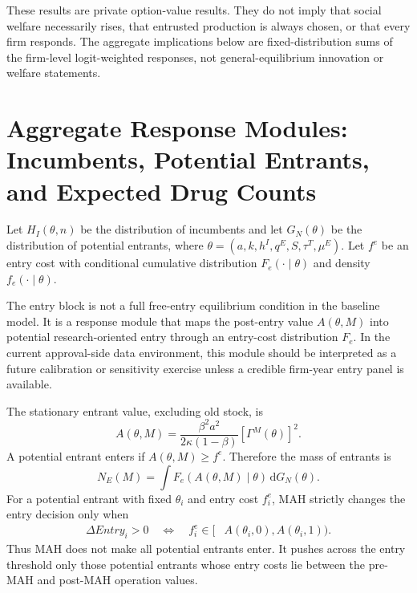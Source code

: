\documentclass[12pt]{article}
\newcommand{\1}{\mathbf{1}}
\newcommand{\dd}{\mathrm{d}}
\begin{document}
These results are private option-value results. They do not imply that social welfare necessarily rises, that entrusted production is always chosen, or that every firm responds. The aggregate implications below are fixed-distribution sums of the firm-level logit-weighted responses, not general-equilibrium innovation or welfare statements.

\section{Aggregate Response Modules: Incumbents, Potential Entrants, and Expected Drug Counts}

Let $H_I(\theta,n)$ be the distribution of incumbents and let $G_N(\theta)$ be the distribution of potential entrants, where $\theta=(a,k,h^I,q^E,S,\tau^T,\mu^E)$. Let $f^e$ be an entry cost with conditional cumulative distribution $F_e(\cdot\mid\theta)$ and density $f_e(\cdot\mid\theta)$.

The entry block is not a full free-entry equilibrium condition in the baseline model. It is a response module that maps the post-entry value $A(\theta,M)$ into potential research-oriented entry through an entry-cost distribution $F_e$. In the current approval-side data environment, this module should be interpreted as a future calibration or sensitivity exercise unless a credible firm-year entry panel is available.

The stationary entrant value, excluding old stock, is
\begin{equation}
    A(\theta,M)
    =
    \frac{\beta^2 a^2}{2\kappa(1-\beta)}
    \left[\Gamma^M(\theta)\right]^2.
    \label{eq:entrant_value}
\end{equation}
A potential entrant enters if $A(\theta,M)\ge f^e$. Therefore the mass of entrants is
\begin{equation}
    N_E(M)=
    \int
    F_e\!\left(A(\theta,M)\mid\theta\right)
    \,\dd G_N(\theta).
    \label{eq:entrymass}
\end{equation}
For a potential entrant with fixed $\theta_i$ and entry cost $f_i^e$, MAH strictly changes the entry decision only when
\begin{align}
    \Delta Entry_i>0
    \quad\Longleftrightarrow\quad
    f_i^e
    \in
    [&A(\theta_i,0),A(\theta_i,1)).
    \label{eq:entry_threshold}
\end{align}
Thus MAH does not make all potential entrants enter. It pushes across the entry threshold only those potential entrants whose entry costs lie between the pre-MAH and post-MAH operation values.
\end{document}
